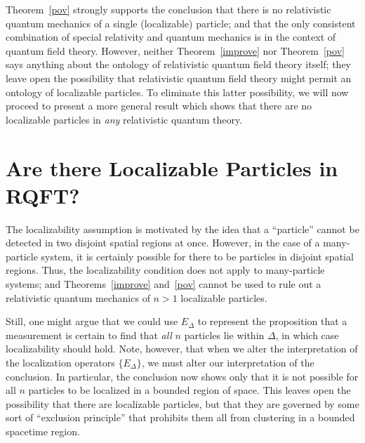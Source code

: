 \documentclass[12pt]{article}
\theoremstyle{remark}
\begin{document}
Theorem~\ref{pov} strongly supports the conclusion that there is no
relativistic quantum mechanics of a single (localizable) particle; and
that the only consistent combination of special relativity and quantum
mechanics is in the context of quantum field theory.  However, neither
Theorem~\ref{improve} nor Theorem~\ref{pov} says anything about the
ontology of relativistic quantum field theory itself; they leave open
the possibility that relativistic quantum field theory might permit an
ontology of localizable particles.  To eliminate this latter
possibility, we will now proceed to present a more general result
which shows that there are no localizable particles in \emph{any}
relativistic quantum theory.

\section{Are there Localizable Particles in RQFT?} \label{numbers}
The localizability assumption is motivated by the idea that a
``particle'' cannot be detected in two disjoint spatial regions at
once.  However, in the case of a many-particle system, it is certainly
possible for there to be particles in disjoint spatial regions.  Thus,
the localizability condition does not apply to many-particle systems;
and Theorems~\ref{improve} and~\ref{pov} cannot be used to rule out a
relativistic quantum mechanics of $n>1$ localizable particles.

Still, one might argue that we could use $E_{\Delta}$ to represent the
proposition that a measurement is certain to find that \emph{all} $n$
particles lie within $\Delta$, in which case localizability should
hold.  Note, however, that when we alter the interpretation of the
localization operators $\{ E_{\Delta} \}$, we must alter our
interpretation of the conclusion.  In particular, the conclusion now
shows only that it is not possible for all $n$ particles to be
localized in a bounded region of space.  This leaves open the
possibility that there are localizable particles, but that they are
governed by some sort of ``exclusion principle'' that prohibits them
all from clustering in a bounded spacetime region.
\end{document}
